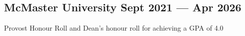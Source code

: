 
\subsection{{McMaster University \hfill Sept 2021 --- Apr 2026}}
\begin{zitemize}
    \item Provost Honour Roll and Dean's honour roll for achieving a GPA of 4.0

\end{zitemize}

